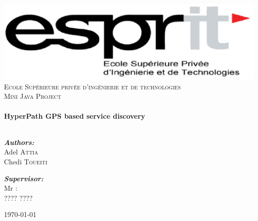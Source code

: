\begin{titlepage}
\begin{center}
\includegraphics[scale=0.6]{Figures/Esprit_logo}\\[1cm]    

\textsc{\LARGE Ecole Supérieure privée d'ingénierie et de technologies}\\[1.5cm]
\textsc{\Large Mini Java Project}\\[0.5cm]


\HRule \\[0.4cm]
{ \huge \bfseries HyperPath GPS based service discovery}\\[0.4cm]
\HRule \\[1.5cm]

\begin{minipage}{0.4\textwidth}
\begin{flushleft} \large
\textbf{\emph{Authors:}}\\
Adel \textsc{Attia}   \\
Chedi \textsc{Toueiti}\\
\end{flushleft}
\end{minipage}
\begin{minipage}{0.4\textwidth}
\begin{flushright} \large
\begin{flushleft}
\textbf{\emph{Supervisor:}}\\
Mr : \\
???? \textsc{????}\\
\end{flushleft}
\end{flushright}
\end{minipage}
\vfill
{\large \today}

\end{center}
\end{titlepage}





